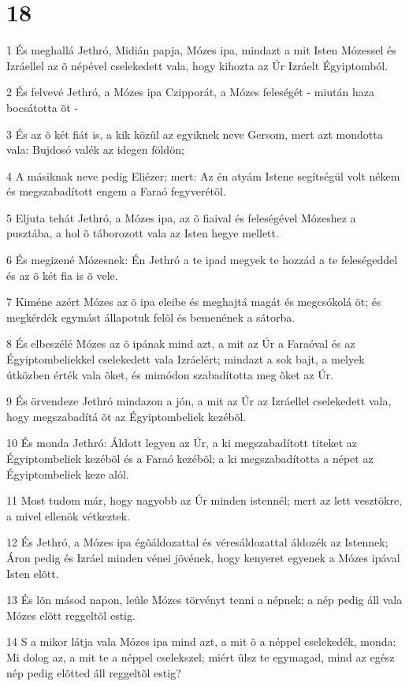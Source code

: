 \chapter{18}

\par 1 És meghallá Jethró, Midián papja, Mózes ipa, mindazt a mit Isten Mózessel és Izráellel az õ népével cselekedett vala, hogy kihozta az Úr Izráelt Égyiptomból.
\par 2 És felvevé Jethró, a Mózes ipa Czipporát, a Mózes feleségét - miután haza bocsátotta õt -
\par 3 És az õ két fiát is, a kik közûl az egyiknek neve Gersom, mert azt mondotta vala: Bujdosó valék az idegen földön;
\par 4 A másiknak neve pedig Eliézer; mert: Az én atyám Istene segítségül volt nékem és megszabadított engem a Faraó fegyverétõl.
\par 5 Eljuta tehát Jethró, a Mózes ipa, az õ fiaival és feleségével Mózeshez a pusztába, a hol õ táborozott vala az Isten hegye mellett.
\par 6 És megizené Mózesnek: Én Jethró a te ipad megyek te hozzád a te feleségeddel és az õ két fia is õ vele.
\par 7 Kiméne azért Mózes az õ ipa eleibe és meghajtá magát és megcsókolá õt; és megkérdék egymást állapotuk felõl és bemenének a sátorba.
\par 8 És elbeszélé Mózes az õ ipának mind azt, a mit az Úr a Faraóval és az Égyiptombeliekkel cselekedett vala Izráelért; mindazt a sok bajt, a melyek útközben érték vala õket, és mimódon szabadította meg õket az Úr.
\par 9 És örvendeze Jethró mindazon a jón, a mit az Úr az Izráellel cselekedett vala, hogy megszabadítá õt az Égyiptombeliek kezébõl.
\par 10 És monda Jethró: Áldott legyen az Úr, a ki megszabadított titeket az Égyiptombeliek kezébõl és a Faraó kezébõl; a ki megszabadította a népet az Égyiptombeliek keze alól.
\par 11 Most tudom már, hogy nagyobb az Úr minden istennél; mert az lett vesztökre, a mivel ellenök vétkeztek.
\par 12 És Jethró, a Mózes ipa égõáldozattal és véresáldozattal áldozék az Istennek; Áron pedig és Izráel minden vénei jövének, hogy kenyeret egyenek a Mózes ipával Isten elõtt.
\par 13 És lõn másod napon, leûle Mózes törvényt tenni a népnek; a nép pedig áll vala Mózes elõtt reggeltõl estig.
\par 14 S a mikor látja vala Mózes ipa mind azt, a mit õ a néppel cselekedék, monda: Mi dolog az, a mit te a néppel cselekszel; miért ûlsz te egymagad, mind az egész nép pedig elõtted áll reggeltõl estig?
